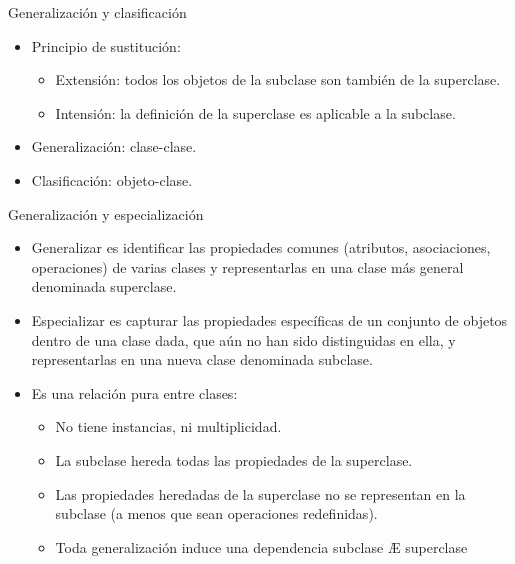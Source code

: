 \documentclass[12pt, twoside, openright]{report} %
\begin{document}
	Generalización y clasificación

    \begin{itemize}
    
    \item
      Principio de sustitución:

      \begin{itemize}
      
      \item
        Extensión: todos los objetos de la subclase son también de la
        superclase.
      \item
        Intensión: la definición de la superclase es aplicable a la
        subclase.
      \end{itemize}
    \item
      Generalización: clase-clase.
    \item
      Clasificación: objeto-clase.
    \end{itemize}

	Generalización y especialización

    \begin{itemize}
    
    \item
      Generalizar es identificar las propiedades comunes (atributos,
      asociaciones, operaciones) de varias clases y representarlas en
      una clase más general denominada superclase.
    \item
      Especializar es capturar las propiedades específicas de un conjunto
      de objetos dentro de una clase dada, que aún no han sido
      distinguidas en ella, y representarlas en una nueva clase
      denominada subclase.
	  \pagebreak
    \item
      Es una relación pura entre clases:

      \begin{itemize}
      
      \item
        No tiene instancias, ni multiplicidad.
      \item
        La subclase hereda todas las propiedades de la superclase.
      \item
        Las propiedades heredadas de la superclase no se representan en
        la subclase (a menos que sean operaciones redefinidas).
      \item
        Toda generalización induce una dependencia subclase Æ superclase
      \end{itemize}
    \end{itemize}
\end{document}
